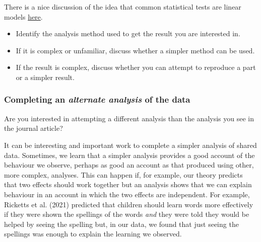 \documentclass[
  letterpaper,
  DIV=11,
  numbers=noendperiod]{scrreprt}
\providecommand{\tightlist}{%
  \setlength{\itemsep}{0pt}\setlength{\parskip}{0pt}}\usepackage{longtable,booktabs,array}
\begin{document}
There is a nice discussion of the idea that common statistical tests are
linear models \href{https://lindeloev.github.io/tests-as-linear/}{here}.

\begin{tcolorbox}[enhanced jigsaw, opacitybacktitle=0.6, title=\textcolor{quarto-callout-tip-color}{\faLightbulb}\hspace{0.5em}{Tip}, arc=.35mm, colbacktitle=quarto-callout-tip-color!10!white, colframe=quarto-callout-tip-color-frame, leftrule=.75mm, opacityback=0, breakable, titlerule=0mm, left=2mm, bottomrule=.15mm, toprule=.15mm, colback=white, coltitle=black, bottomtitle=1mm, toptitle=1mm, rightrule=.15mm]

\begin{itemize}
\tightlist
\item
  Identify the analysis method used to get the result you are interested
  in.
\item
  If it is complex or unfamiliar, discuss whether a simpler method can
  be used.
\item
  If the result is complex, discuss whether you can attempt to reproduce
  a part or a simpler result.
\end{itemize}

\end{tcolorbox}

\hypertarget{sec-try-multiverse}{%
\subsubsection{\texorpdfstring{Completing an \emph{alternate analysis}
of the
data}{Completing an alternate analysis of the data}}\label{sec-try-multiverse}}

Are you interested in attempting a different analysis than the analysis
you see in the journal article?

It can be interesting and important work to complete a simpler analysis
of shared data. Sometimes, we learn that a simpler analysis provides a
good account of the behaviour we observe, perhaps as good an account as
that produced using other, more complex, analyses. This can happen if,
for example, our theory predicts that two effects should work together
but an analysis shows that we can explain behaviour in an account in
which the two effects are independent. For example, Ricketts et al.
(2021) predicted that children should learn words more effectively if
they were shown the spellings of the words \emph{and} they were told
they would be helped by seeing the spelling but, in our data, we found
that just seeing the spellings was enough to explain the learning we
observed.
\end{document}
